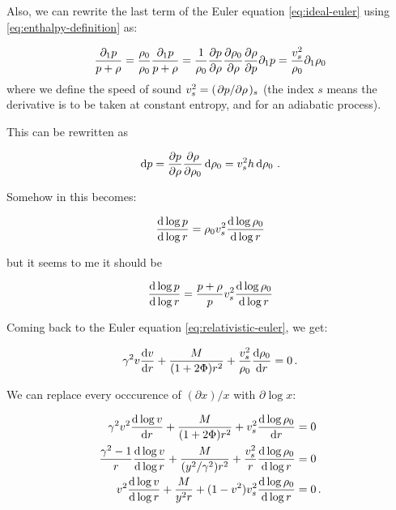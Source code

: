 \documentclass[main.tex]{subfiles}
\begin{document}
Also, we can rewrite the last term of the Euler equation \eqref{eq:ideal-euler} using \eqref{eq:enthalpy-definition}  as:

\begin{equation}
  \frac{\partial_1 p}{p + \rho} =
  \frac{\rho_0}{\rho_0} \frac{\partial_1 p}{p + \rho} =
  \frac{1}{\rho_0} \pdv{p}{\rho} \pdv{\rho_0}{\rho}
  \pdv{\rho}{p}   \partial_1 p =
  \frac{v_s^2}{\rho_0} \partial_1\rho_0
\end{equation}
where we define the speed of sound \(v_s^2 = (\pdv*{p}{\rho})_s\) (the index \(s\) means the derivative is to be taken at constant entropy, and for an adiabatic process).

This can be rewritten as

\begin{equation}
  \dd{p} = \pdv{p}{\rho} \pdv{\rho}{\rho_0} \dd{\rho_0} = v_s^2 h \dd{\rho_0} \,.
\end{equation}

\begin{greenbox}
  Somehow in \cite[page 175]{Nobili:2000} this becomes:

  \begin{equation}
    \dv{\log p }{\log r} = \rho_0 v_s^2 \dv{\log \rho_0}{\log r }
  \end{equation}

  but it seems to me it should be

  \begin{equation}
  \dv{\log p }{\log r} = \frac{p+\rho}{p} v_s^2 \dv{\log \rho_0}{\log r }
  \end{equation}
\end{greenbox}

Coming back to the Euler equation \eqref{eq:relativistic-euler},  we get:

\begin{equation}
  \gamma^2 v \dv{v}{r} + \frac{M}{(1+ 2 \Phi) r^2}
  + \frac{v_s^2 }{\rho_0}\dv{\rho_0}{r} = 0 \,.
\end{equation}

We can replace every occcurence of \((\partial x) / x \) with \(\partial \log x \):

\begin{subequations}
\begin{align}
  \gamma^2 v^2 \dv{\log v}{r} + \frac{M}{(1+ 2 \Phi) r^2} + v_s^2 \dv{\log \rho_0}{r}  &= 0 \\
  \frac{\gamma^2 - 1}{r}  \dv{\log v}{\log r} + \frac{M}{(y^2/\gamma^2) r^2}
  + \frac{v_s^2}{r} \dv{\log \rho_0}{\log r}  &= 0  \\
  v^2  \dv{\log v}{\log r} + \frac{M}{y^2 r}
  + (1-v^2) v_s^2 \dv{\log \rho_0}{\log r}  &= 0 \,.
\end{align}
\end{subequations}
\end{document}
